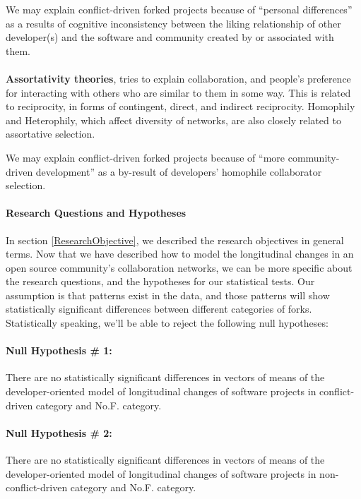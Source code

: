 \documentclass[12pt]{report}
\begin{document}
We may explain conflict-driven forked projects because of ``personal differences'' as a results of cognitive inconsistency between the liking relationship of other developer(s) and the software and community created by or associated with them. 

\paragraph{} \textbf{Assortativity theories}, tries to explain collaboration, and people's preference for interacting with others who are similar to them in some way. This is related to reciprocity, in forms of contingent, direct, and indirect reciprocity. Homophily and Heterophily, which affect diversity of networks, are also closely related to assortative selection.

We may explain conflict-driven forked projects because of ``more community-driven development'' as a by-result of developers' homophile collaborator selection.


\paragraph*{Research Questions and Hypotheses}
\label{RQs}
In section \ref{ResearchObjective}, we described the research objectives in general terms. Now that we have described how to model the longitudinal changes in an open source community's collaboration networks, we can be more specific about the research questions, and the hypotheses for our statistical tests. Our assumption is that patterns exist in the data, and those patterns will show statistically significant differences between different categories of forks. Statistically speaking, we'll be able to reject the following null hypotheses:

\paragraph*{Null Hypothesis \# 1:} 
\hspace{10 mm} There are no statistically significant differences in vectors of means of the developer-oriented model of longitudinal changes of software projects in conflict-driven category and No.F. category.

\paragraph*{Null Hypothesis \# 2:} 
\hspace{10 mm} There are no statistically significant differences in vectors of means of the developer-oriented model of longitudinal changes of software projects in non-conflict-driven category and No.F. category.
\end{document}

